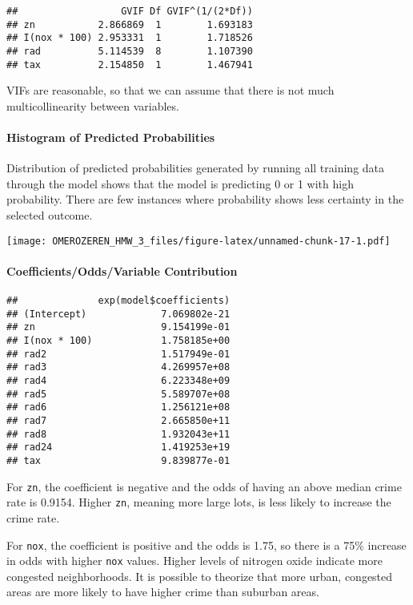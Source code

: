 \documentclass[]{article}
\let\oldparagraph\paragraph
\renewcommand{\paragraph}[1]{\oldparagraph{#1}\mbox{}}
\begin{document}
\begin{verbatim}
##                  GVIF Df GVIF^(1/(2*Df))
## zn           2.866869  1        1.693183
## I(nox * 100) 2.953331  1        1.718526
## rad          5.114539  8        1.107390
## tax          2.154850  1        1.467941
\end{verbatim}

VIFs are reasonable, so that we can assume that there is not much
multicollinearity between variables.

\hypertarget{histogram-of-predicted-probabilities}{%
\paragraph{Histogram of Predicted
Probabilities}\label{histogram-of-predicted-probabilities}}

Distribution of predicted probabilities generated by running all
training data through the model shows that the model is predicting 0 or
1 with high probability. There are few instances where probability shows
less certainty in the selected outcome.

\texttt{[image: OMEROZEREN\_HMW\_3\_files/figure-latex/unnamed-chunk-17-1.pdf]}

\hypertarget{coefficientsoddsvariable-contribution}{%
\paragraph{Coefficients/Odds/Variable
Contribution}\label{coefficientsoddsvariable-contribution}}

\begin{verbatim}
##              exp(model$coefficients)
## (Intercept)             7.069802e-21
## zn                      9.154199e-01
## I(nox * 100)            1.758185e+00
## rad2                    1.517949e-01
## rad3                    4.269957e+08
## rad4                    6.223348e+09
## rad5                    5.589707e+08
## rad6                    1.256121e+08
## rad7                    2.665850e+11
## rad8                    1.932043e+11
## rad24                   1.419253e+19
## tax                     9.839877e-01
\end{verbatim}

For \texttt{zn}, the coefficient is negative and the odds of having an
above median crime rate is 0.9154. Higher \texttt{zn}, meaning more
large lots, is less likely to increase the crime rate.

For \texttt{nox}, the coefficient is positive and the odds is 1.75, so
there is a 75\% increase in odds with higher \texttt{nox} values. Higher
levels of nitrogen oxide indicate more congested neighborhoods. It is
possible to theorize that more urban, congested areas are more likely to
have higher crime than suburban areas.
\end{document}
